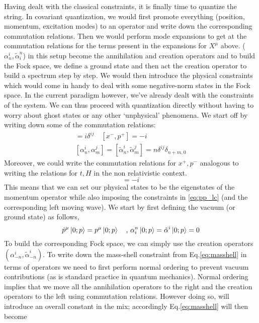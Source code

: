 \documentclass{article}
\begin{document}
Having dealt with the classical constraints, it is finally time to quantize the string. In covariant quantization, we would first promote everything (position, momentum, excitation modes) to an operator and write down the corresponding commutation relations. Then we would perform mode expansions to get at the commutation relations for the terms present in the expansions for $X^\mu$ above. ($\alpha_n^i,\tilde{\alpha}^n_i$) in this setup become the annihilation and creation operators and to build the Fock space, we define a ground state and then act the creation operator to build a spectrum step by step. We would then introduce the physical constraints which would come in handy to deal with some negative-norm states in the Fock space. In the current paradigm however, we've already dealt with the constraints of the system. We can thus proceed with quantization directly without having to worry about ghost states or any other `unphysical' phenomena. We start off by writing down some of the commutation relations:
\begin{align}
	[x^i,p^j] = i\delta^{ij} \quad[x^-,p^+]=-i\nonumber\\
	[\alpha^i_n,\alpha^j_m]=[\tilde{\alpha}^i_n,\tilde{\alpha}^j_m]=n\delta^{ij}\delta_{n+m,0}
\end{align}
Moreover, we could write the commutation relations for $x^+,p^-$ analogous to writing the relations for $t,H$ in the non relativistic context.
\begin{equation}
    [x^+,p^-] = -i
\end{equation}
This means that we can set our physical states to be the eigenstates of the momentum operator while also imposing the constraints in \eqref{eq:pp_lc} (and the corresponding left moving wave). We start by first defining the vacuum (or ground state) as follows,
\begin{equation}
    \hat{p}^\mu\ket{0;p}=p^\mu\ket{0;p} \quad\text{, }\alpha_i^n\ket{0;p}=\tilde{\alpha}^i\ket{0;p}=0
\end{equation}
To build the corresponding Fock space, we can simply use the creation operators $(\alpha^i_{-n}, \tilde{\alpha}^i_{-n})$. To write down the mass-shell constraint from Eq.\eqref{eq:masshell} in terms of operators we need to first perform normal ordering to prevent vacuum contributions (as is standard practice in quantum mechanics). Normal ordering implies that we move all the annihilation operators to the right and the creation operators to the left using commutation relations. However doing so, will introduce an overall constant in the mix; accordingly Eq.\eqref{eq:masshell} will then become
\end{document}
